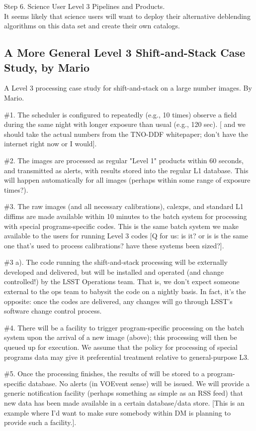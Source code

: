 \documentclass[DM,lsstdraft,toc]{lsstdoc}
\begin{document}
Step 6. Science User Level 3 Pipelines and Products. \\
It seems likely that science users will want to deploy their alternative deblending algorithms on this data set and create their own catalogs.


\subsection{A More General Level 3 Shift-and-Stack Case Study, by Mario}\label{ssec:SPCS_SAS}

A Level 3 processing case study for shift-and-stack on a large number images. By Mario.

\#1. The scheduler is configured to repeatedly (e.g., 10 times) observe a field during the same night with longer exposure than usual (e.g., 120 sec). [ and we should take the actual numbers from the TNO-DDF whitepaper; don't have the internet right now or I would].

\#2. The images are processed as regular "Level 1" products within 60 seconds, and transmitted as alerts, with results stored into the regular L1 database. This will happen automatically for all images (perhaps within some range of exposure times?).

\#3. The raw images (and all necessary calibrations), calexps, and standard L1 diffims are made available within 10 minutes to the batch system for processing with special programs-specific codes. This is the same batch system we make available to the users for running Level 3 codes [Q for us: is it? or is is the same one that's used to process calibrations? have these systems been sized?].

\#3 a). The code running the shift-and-stack processing will be externally developed and delivered, but will be installed and operated (and change controlled!) by the LSST Operations team. That is, we don't expect someone external to the ops team to babysit the code on a nightly basis. In fact, it's the opposite: once the codes are delivered, any changes will go through LSST's software change control process.

\#4. There will be a facility to trigger program-specific processing on the batch system upon the arrival of a new image (above); this processing will then be queued up for execution. We assume that the policy for processing of special programs data may give it preferential treatment relative to general-purpose L3.

\#5. Once the processing finishes, the results of will be stored to a program-specific database. No alerts (in VOEvent sense) will be issued. We will provide a generic notification facility (perhaps something as simple as an RSS feed) that new data has been made available in a certain database/data store. [This is an example where I'd want to make sure somebody within DM is planning to provide such a facility.].
\end{document}
